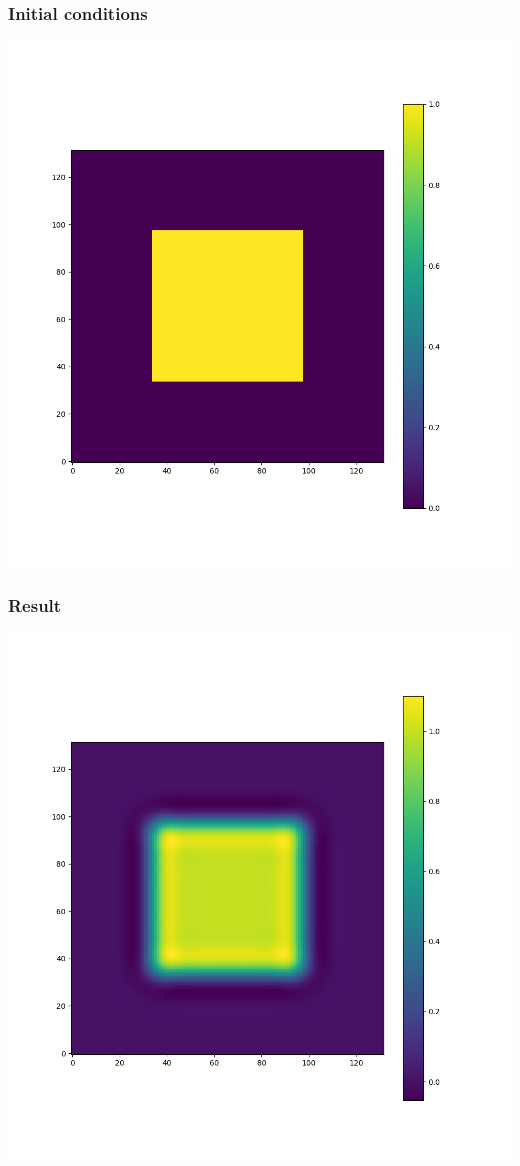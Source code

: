 \documentclass[aspectratio=43, t]{beamer}
\begin{document}
\begin{frame}
	\frametitle{Initial conditions}
	\centering
	\includegraphics[width = \textwidth, height = \textheight, keepaspectratio]{in_field}
	\par
\end{frame}

\begin{frame}
	\frametitle{Result}
	\centering
	\includegraphics[width = \textwidth, height = \textheight, keepaspectratio]{out_field}
	\par
\end{frame}
\end{document}
